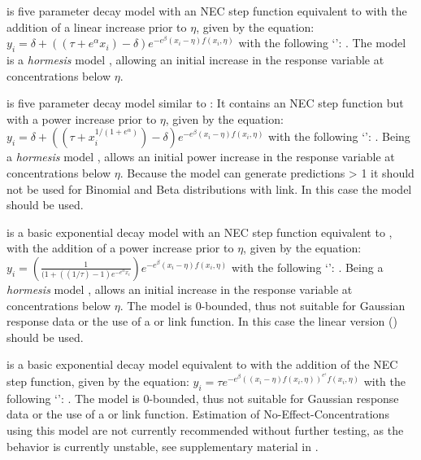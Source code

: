 \documentclass[
  shortnames]{jss}
\newcommand{\cls}[1]{`\code{#1}'}
\begin{document}
 is five parameter decay model with an NEC step function equivalent to  with the addition of a linear increase prior to \(\eta\), given by the equation:
\(y_i = \delta + ((\tau + e^{\alpha} x_i) - \delta ) e^{-e^{\beta} \left(x_i - \eta \right) f(x_i, \eta)}\)
with the following \cls{brmsformula}: . The  model is a \emph{hormesis} model \citep{Mattson2008}, allowing an initial increase in the response variable at concentrations below \(\eta\).

 is five parameter decay model similar to : It contains an NEC step function but with a power increase prior to \(\eta\), given by the equation:
\(y_i = \delta + ((\tau + x_i^{1 / (1+e^{\alpha})}) - \delta) e^{-e^{\beta} \left(x_i - \eta \right) f(x_i, \eta)}\)
with the following \cls{brmsformula}: . Being a \emph{hormesis} model \citep{Mattson2008},  allows an initial power increase in the response variable at concentrations below \(\eta\). Because the model can generate predictions \textgreater{} 1 it should not be used for Binomial and Beta distributions with  link. In this case the  model should be used.

 is a basic exponential decay model with an NEC step function equivalent to , with the addition of a power increase prior to \(\eta\), given by the equation:
\(y_i = \left(\frac{1}{(1 + ((1 / \tau)-1) e^{-e^{\alpha}x_i}}\right) e^{-e^{\beta} \left(x_i - \eta \right) f(x_i, \eta)}\)
with the following \cls{brmsformula}: . \linebreak Being a \emph{hormesis} model \citep{Mattson2008},  allows an initial increase in the response variable at concentrations below \(\eta\). The model is 0-bounded, thus not suitable for Gaussian response data or the use of a  or  link function. In this case the linear version () should be used.

 is a basic exponential decay model equivalent to  with the addition of the NEC step function, given by the equation:
\(y_i = \tau e^{-e^{\beta} ((x_i - \eta) f(x_i, \eta))^{e^\epsilon} f(x_i, \eta)}\)
with the following \cls{brmsformula}: . The model is 0-bounded, thus not suitable for Gaussian response data or the use of a  or  link function. Estimation of No-Effect-Concentrations using this model are not currently recommended without further testing, as the behavior is currently unstable, see supplementary material in \citet{fisher2023ieam}.
\end{document}
